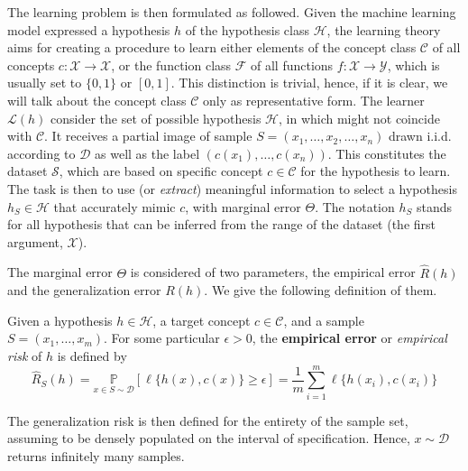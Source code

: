 \documentclass[
  journal=largetwo,
  year=2025,
  volume=37,
]{cup-journal}
\begin{document}
The learning problem is then formulated as followed. Given the machine learning model expressed a hypothesis $h$ of the hypothesis class $\mathcal{H}$, the learning theory aims for creating a procedure to learn either elements of the concept class $\mathcal{C}$ of all concepts $c: \mathcal{X}\to \mathcal{X}$, or the function class $\mathcal{F}$ of all functions $f: \mathcal{X}\to \mathcal{Y}$, which is usually set to $\{0,1\}$ or $[0,1]$. This distinction is trivial, hence, if it is clear, we will talk about the concept class $\mathcal{C}$ only as representative form. The learner $\mathcal{L}(h)$ consider the set of possible hypothesis $\mathcal{H}$, in which might not coincide with $\mathcal{C}$. It receives a partial image of sample $S=(x_{1},\dots,x_{2},\dots,x_n)$ drawn i.i.d. according to $\mathcal{D}$ as well as the label $(c(x_1),\dots,c(x_n))$. This constitutes the dataset $\mathcal{S}$, which are based on specific concept $c\in \mathcal{C}$ for the hypothesis to learn. The task is then to use (or \textit{extract}) meaningful information to select a hypothesis $h_{S}\in \mathcal{H}$ that accurately mimic $c$, with marginal error $\Theta$. The notation $h_{S}$ stands for all hypothesis that can be inferred from the range of the dataset (the first argument, $\mathcal{X}$). 

The marginal error $\Theta$ is considered of two parameters, the empirical error $\hat{R}(h)$ and the generalization error $R(h)$. We give the following definition of them. 

\begin{definition}
    Given a hypothesis $h\in \mathcal{H}$, a target concept $c\in \mathcal{C}$, and a sample $S=(x_{1},\dots,x_{m})$. For some particular $\epsilon>0$, the \textbf{empirical error} or \textit{empirical risk} of $h$ is defined by\begin{equation}
        \hat{R}_{S}(h) = \underset{x\in S\sim\mathcal{D}}{\mathbb{P}} [\ell\{h(x),c(x)\}\geq \epsilon] =\frac{1}{m} \sum_{i=1}^{m} \ell\{h(x_i),c(x_i)\}
    \end{equation}
\end{definition}

The generalization risk is then defined for the entirety of the sample set, assuming to be densely populated on the interval of specification. Hence, $x\sim \mathcal{D}$ returns infinitely many samples. 
\end{document}
